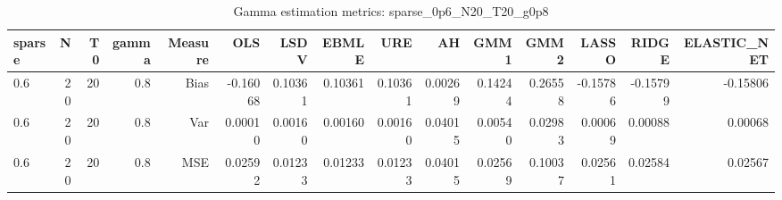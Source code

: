 \begin{table}[!htbp]\centering
\caption{Gamma estimation metrics: sparse_0p6_N20_T20_g0p8}
\label{tab:table1_sparse_0p6_N20_T20_g0p8}
\begin{tabular}{lrrrrrrrrrrrrrr}
\hline
sparse & N & T0 & gamma & Measure & OLS & LSDV & EBMLE & URE & AH & GMM1 & GMM2 & LASSO & RIDGE & ELASTIC_NET \\
\hline
0.6 & 20 & 20 & 0.8 & Bias & -0.16068 & 0.10361 & 0.10361 & 0.10361 & 0.00269 & 0.14244 & 0.26558 & -0.15786 & -0.15799 & -0.15806 \\
0.6 & 20 & 20 & 0.8 & Var & 0.00010 & 0.00160 & 0.00160 & 0.00160 & 0.04015 & 0.00540 & 0.02983 & 0.00069 & 0.00088 & 0.00068 \\
0.6 & 20 & 20 & 0.8 & MSE & 0.02592 & 0.01233 & 0.01233 & 0.01233 & 0.04015 & 0.02569 & 0.10037 & 0.02561 & 0.02584 & 0.02567 \\
\hline
\end{tabular}
\end{table}

